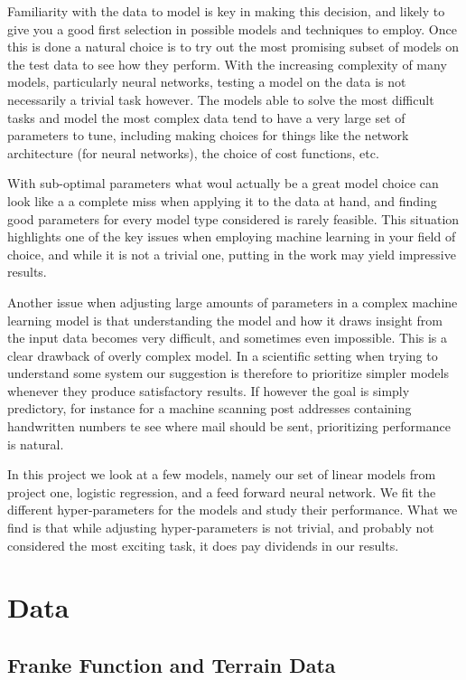 \documentclass[11pt]{article}
\begin{document}
Familiarity with the data to model is key in making this decision, and likely to give you a good first selection in possible models and techniques to employ. Once this is done a natural choice is to try out the most promising subset of models on the test data to see how they perform. With the increasing complexity of many models, particularly neural networks, testing a model on the data is not necessarily a trivial task however. The models able to solve the most difficult tasks and model the most complex data tend to have a very large set of parameters to tune, including making choices for things like the network architecture (for neural networks), the choice of cost functions, etc. 

With sub-optimal parameters what woul actually be a great model choice can look like a a complete miss when applying it to the data at hand, and finding good parameters for every model type considered is rarely feasible. This situation highlights one of the key issues when employing machine learning in your field of choice, and while it is not a trivial one, putting in the work may yield impressive results.

Another issue when adjusting large amounts of parameters in a complex machine learning model is that understanding the model and how it draws insight from the input data becomes very difficult, and sometimes even impossible. This is a clear drawback of overly complex model. In a scientific setting when trying to understand some system our suggestion is therefore to prioritize simpler models whenever they produce satisfactory results. If however the goal is simply predictory, for instance for a machine scanning post addresses containing handwritten numbers te see where mail should be sent, prioritizing performance is natural.

In this project we look at a few models, namely our set of linear models from project one, logistic regression, and a feed forward neural network. We fit the different hyper-parameters for the models and study their performance. What we find is that while adjusting hyper-parameters is not trivial, and probably not considered the most exciting task, it does pay dividends in our results.

    \hypertarget{data}{%
\section{Data}\label{data}}

\hypertarget{franke-function-and-terrain-data}{%
\subsection{Franke Function and Terrain
Data}\label{franke-function-and-terrain-data}}
\end{document}
